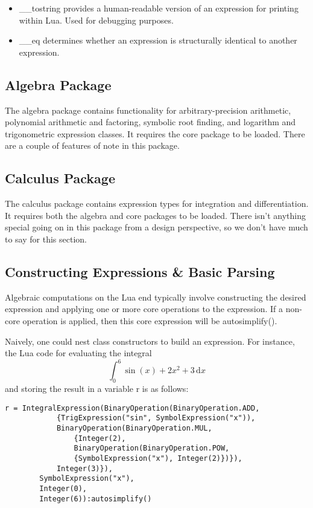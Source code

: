 \documentclass{article}
\begin{document}
\begin{itemize}
    \item {\ttfamily \_\_tostring} provides a human-readable version of an expression for printing within Lua. Used for debugging purposes.
    
    \item {\ttfamily \_\_eq} determines whether an expression is structurally identical to another expression.
\end{itemize}

\subsection{Algebra Package}

The algebra package contains functionality for arbitrary-precision arithmetic, polynomial arithmetic and factoring, symbolic root finding, and logarithm and trigonometric expression classes. It requires the core package to be loaded. There are a couple of features of note in this package.

\subsection{Calculus Package}

The calculus package contains expression types for integration and differentiation. It requires both the algebra and core packages to be loaded. There isn't anything special going on in this package from a design perspective, so we don't have much to say for this section.

\subsection{Constructing Expressions \& Basic Parsing}

Algebraic computations on the Lua end typically involve constructing the desired expression and applying one or more core operations to the expression. If a non-core operation is applied, then this core expression will be {\ttfamily autosimplify()}.

Naively, one could nest class constructors to build an expression. For instance, the Lua code for evaluating the integral \[ \int_0^6 \sin(x) + 2x^2 + 3 \hspace{2pt}\mathrm{d}x\] and storing the result in a variable {\ttfamily r} is as follows:

\begin{verbatim}
r = IntegralExpression(BinaryOperation(BinaryOperation.ADD,
            {TrigExpression("sin", SymbolExpression("x")),
            BinaryOperation(BinaryOperation.MUL,
                {Integer(2),
                BinaryOperation(BinaryOperation.POW,
                {SymbolExpression("x"), Integer(2)})}),
            Integer(3)}),
        SymbolExpression("x"),
        Integer(0),
        Integer(6)):autosimplify()
\end{verbatim}
\end{document}
